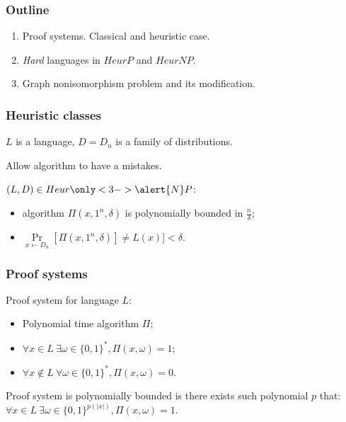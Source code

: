 \begin{frame}
    \frametitle{Outline}

    \begin{enumerate}
	    \item Proof systems. Classical and heuristic case.
    	\item \textit{Hard} languages in $HeurP$ and $HeurNP$.
    	\item Graph nonisomorphism problem and its modification.
    \end{enumerate}
\end{frame}


\begin{frame}
    \frametitle{Heuristic classes}

    $L$ is a language, $D = {D_n}$ is a family of distributions.

    Allow algorithm to have a mistakes.

    \pause
    \begin{definition}
        $(L, D) \in Heur\only<3->{\alert{N}}P$:
        \begin{itemize}
            \item {} 
		        algorithm $\Pi(x, 1^n, \delta)$ is polynomially bounded in
                $\frac{n}{\delta}$;
            \item $\Pr\limits_{x \gets D_n}[\Pi(x, 1^n, \delta)] \neq
        		L(x)] < \delta$.
        \end{itemize}
    \end{definition}
\end{frame}


\begin{frame}
	\frametitle{Proof systems}

    \begin{definition}
        Proof system for language $L$:
        \begin{itemize}
            \item Polynomial time algorithm $\Pi$;
            \item $\forall x \in L~ \exists \omega \in \{0, 1\}^{*}, \Pi(x, \omega) = 1$;
        	\item $\forall x \notin L~ \forall \omega \in \{0, 1\}^{*}, 
        		\Pi(x, \omega) = 0$.
        \end{itemize}
    \end{definition}

    \pause
    Proof system is polynomially bounded is there exists such polynomial $p$ that:
    $\forall x \in L~ \exists \omega \in \{0, 1\}^{p(|x|)}, \Pi(x, \omega) = 1$.

\end{frame}


